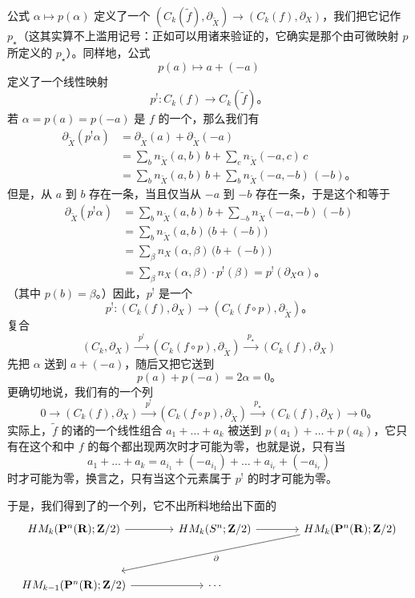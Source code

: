 公式 $\alpha\mapsto p(\alpha)$ 定义了一个\trComplex\trMorphism{} $(C_k(\widetilde f),\partial_{\widetilde X})\to(C_k(f),\partial_X)$，我们把它记作 $p_\star$（这其实算不上滥用记号：正如可以用诸\trEmbedding{}来验证的，它确实是那个由可微映射 $p$ 所定义的 $p_\star$）。同样地，公式
\[
p(a)\longmapsto a+(-a)
\]
定义了一个线性映射
\[
p^!\colon C_k(f)\longrightarrow C_k(\widetilde f)\text{。}
\]
若 $\alpha=p(a)=p(-a)$ 是 $f$ 的一个\trCriticalPoint，那么我们有
\[
\begin{aligned}
\partial_{\widetilde X}(p^!\alpha)
  &=\partial_{\widetilde X}(a)+\partial_{\widetilde X}(-a)\\
  &=\sum_b n_{\widetilde X}(a,b)\,b+\sum_c n_{\widetilde X}(-a,c)\,c\\
  &=\sum_b n_{\widetilde X}(a,b)\,b+\sum_b n_{\widetilde X}(-a,-b)\,(-b)\text{。}
\end{aligned}
\]
但是，从 $a$ 到 $b$ 存在一条\trTrajectory，当且仅当从 $-a$ 到 $-b$ 存在一条\trTrajectory，于是这个和等于
\[
\begin{aligned}
\partial_{\widetilde X}(p^!\alpha)
  &=\sum_b n_{\widetilde X}(a,b)\,b+\sum_{-b} n_{\widetilde X}(-a,-b)\,(-b)\\
  &=\sum_b n_{\widetilde X}(a,b)\,\bigl(b+(-b)\bigr)\\
  &=\sum_\beta n_X(\alpha,\beta)\,\bigl(b+(-b)\bigr)\\
  &=\sum_\beta n_X(\alpha,\beta)\cdot p^!(\beta)=p^!(\partial_X\alpha)\text{。}
\end{aligned}
\]
（其中 $p(b)=\beta$。）因此，$p^!$ 是一个\trComplex\trMorphism
\[
p^!\colon(C_k(f),\partial_X)\longrightarrow(C_k(f\circ p),\partial_{\widetilde X})\text{。}
\]
复合
\[
(C_k,\partial_X)\xrightarrow{\ \ p^!\ \ }(C_k(f\circ p),\partial_{\widetilde X})
  \xrightarrow{\ \ p_\star\ \ }(C_k(f),\partial_X)
\]
先把\trCriticalPoint{} $\alpha$ 送到 $a+(-a)$，随后又把它送到
\[
p(a)+p(-a)=2\alpha=0\text{。}
\]
更确切地说，我们有\trComplex{}的一个\trExact{}列
\[
0\longrightarrow(C_k(f),\partial_X)\xrightarrow{\ \ p^!\ \ }(C_k(f\circ p),\partial_{\widetilde X})
  \xrightarrow{\ \ p_\star\ \ }(C_k(f),\partial_X)\longrightarrow 0\text{。}
\]
实际上，$\widetilde f$ 的诸\trCriticalPoint{}的一个线性组合 $a_1+\dots+a_k$ 被送到 $p(a_1)+\dots+p(a_k)$，它只有在这个和中 $f$ 的每个\trCriticalPoint{}都出现两次时才可能为零，也就是说，只有当
\[
a_1+\dots+a_k=a_{i_1}+(-a_{i_1})+\dots+a_{i_r}+(-a_{i_r})
\]
时才可能为零，换言之，只有当这个元素属于 $p^!$ 的\trImage{}时才可能为零。

于是，我们得到了\trComplex{}的一个\trExact{}列，它不出所料地给出下面的\trMorseHomology{}\trLongExactSequence
\[
\begin{tikzcd}[column sep=1.35cm,row sep=1.15cm]
HM_k(\CP^n(\RR);\ZZ/2) \ar[r] & HM_k(S^n;\ZZ/2) \ar[r]
  & HM_k(\CP^n(\RR);\ZZ/2) \ar[from=1-3,to=2-1,shift right=1.5mm,"\partial"] \\
HM_{k-1}(\CP^n(\RR);\ZZ/2) \ar[r] & \cdots
\end{tikzcd}
\]

